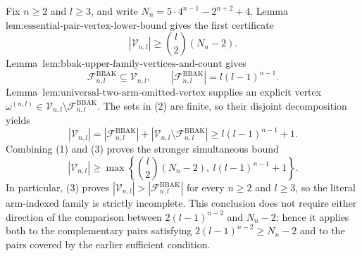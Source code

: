Fix \(n\ge2\) and \(l\ge3\), and write \(N_n=5\cdot4^{n-1}-2^{n+2}+4\). Lemma~\(\text{lem:essential-pair-vertex-lower-bound}\) gives the first certificate
\[|\mathcal V_{n,l}|\ge \binom{l}{2}(N_n-2).\tag{1}\]
Lemma~\(\text{lem:bbak-upper-family-vertices-and-count}\) gives
\[\mathcal F^{\mathrm{BBAK}}_{n,l}\subseteq\mathcal V_{n,l},\qquad |\mathcal F^{\mathrm{BBAK}}_{n,l}|=l(l-1)^{n-1}.\tag{2}\]
Lemma~\(\text{lem:universal-two-arm-omitted-vertex}\) supplies an explicit vertex \(\omega^{(n,l)}\in\mathcal V_{n,l}\setminus\mathcal F^{\mathrm{BBAK}}_{n,l}\). The sets in (2) are finite, so their disjoint decomposition yields
\[|\mathcal V_{n,l}|=|\mathcal F^{\mathrm{BBAK}}_{n,l}|+|\mathcal V_{n,l}\setminus\mathcal F^{\mathrm{BBAK}}_{n,l}|\ge l(l-1)^{n-1}+1.\tag{3}\]
Combining (1) and (3) proves the stronger simultaneous bound
\[|\mathcal V_{n,l}|\ge\max\left\{\binom{l}{2}(N_n-2),\ l(l-1)^{n-1}+1\right\}.\tag{4}\]
In particular, (3) proves \(|\mathcal V_{n,l}|>|\mathcal F^{\mathrm{BBAK}}_{n,l}|\) for every \(n\ge2\) and \(l\ge3\), so the literal arm-indexed family is strictly incomplete. This conclusion does not require either direction of the comparison between \(2(l-1)^{n-2}\) and \(N_n-2\); hence it applies both to the complementary pairs satisfying \(2(l-1)^{n-2}\ge N_n-2\) and to the pairs covered by the earlier sufficient condition.